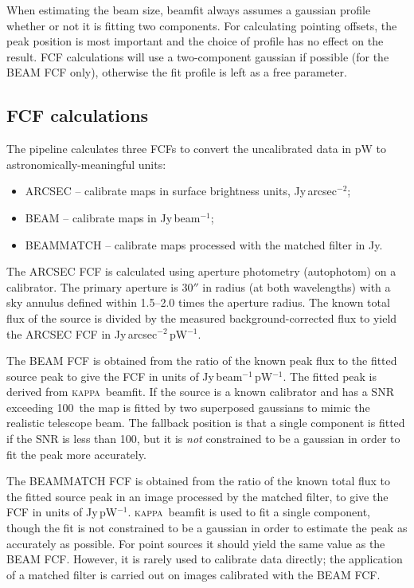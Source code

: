 \documentclass[twoside,11pt]{article}
\renewcommand{\_}{\texttt{\symbol{95}}}
\newcommand{\KAPPA}{\textsc{kappa}}
\newcommand{\task}[1]{\textsf{#1}}
\newcommand{\snrmin}{100}
\begin{document}
When estimating the beam size, \task{beamfit} always assumes a
gaussian profile whether or not it is fitting two components. For
calculating pointing offsets, the peak position is most important and
the choice of profile has no effect on the result. FCF calculations
will use a two-component gaussian if possible (for the BEAM FCF only),
otherwise the fit profile is left as a free parameter.


\subsection{FCF calculations}

The pipeline calculates three FCFs to convert the uncalibrated data in
pW to astronomically-meaningful units:
\begin{itemize}
\item ARCSEC -- calibrate maps in surface brightness units,
  Jy\,arcsec$^{-2}$;
\item BEAM -- calibrate maps in Jy\,beam$^{-1}$;
\item BEAMMATCH -- calibrate maps processed with the matched filter in
  Jy.
\end{itemize}

The ARCSEC FCF is calculated using aperture photometry
(\task{autophotom}) on a calibrator. The primary aperture is 30$''$ in
radius (at both wavelengths) with a sky annulus defined within
1.5--2.0 times the aperture radius. The known total flux of the source
is divided by the measured background-corrected flux to yield the
ARCSEC FCF in Jy\,arcsec$^{-2}$\,pW$^{-1}$.

The BEAM FCF is obtained from the ratio of the known peak flux to the
fitted source peak to give the FCF in units of
Jy\,beam$^{-1}$\,pW$^{-1}$. The fitted peak is derived from
\KAPPA\ \task{beamfit}. If the source is a known calibrator and has a
SNR exceeding \snrmin\ the map is fitted by two superposed gaussians
to mimic the realistic telescope beam. The fallback position is that a
single component is fitted if the SNR is less than \snrmin, but it is
\textit{not} constrained to be a gaussian in order to fit the peak
more accurately.

The BEAMMATCH FCF is obtained from the ratio of the known total flux
to the fitted source peak in an image processed by the matched filter,
to give the FCF in units of Jy\,pW$^{-1}$. \KAPPA\ \task{beamfit} is
used to fit a single component, though the fit is not constrained to
be a gaussian in order to estimate the peak as accurately as
possible. For point sources it should yield the same value as the BEAM
FCF. However, it is rarely used to calibrate data directly; the
application of a matched filter is carried out on images calibrated
with the BEAM FCF.
\end{document}
